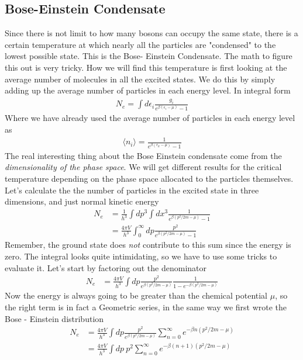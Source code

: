 \subsection{Bose-Einstein Condensate} %
Since there is not limit to how many bosons can occupy the same state, there is a certain temperature at which nearly all the particles are "condensed" to the lowest possible state. This is the Bose- Einstein Condensate. The math to figure this out is very tricky. How we will find this temperature is first looking at the average number of molecules in all the excited states. We do this by simply adding up the average number of particles in each energy level. In integral form
\begin{align}
    N_e = \int d\epsilon_i \frac{g_i}{e^{\beta(\epsilon_i - \mu)} -1}
\end{align}
Where we have already used the average number of particles in each energy level as
\begin{align}
    \langle n_i\rangle = \frac{1}{e^{\beta(\epsilon_k-\mu)}-1}
\end{align}
The real interesting thing about the Bose Einstein condensate come from the \emph{dimensionality of the phase space}. We will get different results for the critical temperature depending on the phase space allocated to the particles themselves. Let's calculate the the number of particles in the excited state in three dimensions, and just normal kinetic energy
\begin{align}
    N_e &= \frac{1}{h^3}\int dp^3\int dx^3 \frac{1}{e^{\beta(p^2/2m - \mu)} -1}\\
    &=\frac{4\pi V}{h^3} \int_0^\infty  dp \frac{p^2}{e^{\beta(p^2/2m - \mu)} -1}
\end{align}
Remember, the ground state does \emph{not} contribute to this sum since the energy is zero. The integral looks quite intimidating, so we have to use some tricks to evaluate it. Let's start by factoring out the denominator
\begin{align}
    N_e &= \frac{4\pi V}{h^3} \int dp \frac{p^2}{e^{\beta(p^2/2m - \mu)}}\frac{1}{1-e^{-\beta(p^2/2m - \mu)}}
\end{align}
Now the energy is always going to be greater than the chemical potential $\mu$, so the right term is in fact a Geometric series, in the same way we first wrote the Bose - Einstein distribution
\begin{align}
    N_e &= \frac{4\pi V}{h^3} \int dp \frac{p^2}{e^{\beta(p^2/2m - \mu)}}\sum_{n=0}^\infty e^{-\beta n(p^2/2m - \mu)}\\
    &=\frac{4\pi V}{h^3} \int dp ~p^2 \sum_{n=0}^\infty e^{-\beta (n+1)(p^2/2m - \mu)}
\end{align}
